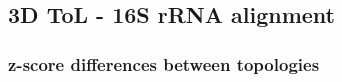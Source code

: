 \begin{appendices}
%
%
%
%
%

\medskip
\newpage
\subsection{3D ToL - 16S rRNA alignment}\label{suppsec:rRNA_based_3DT}

\subsubsection*{z-score differences between topologies}\label{suppsec:3DT_topology_zscore_diffs}


\end{appendices}
